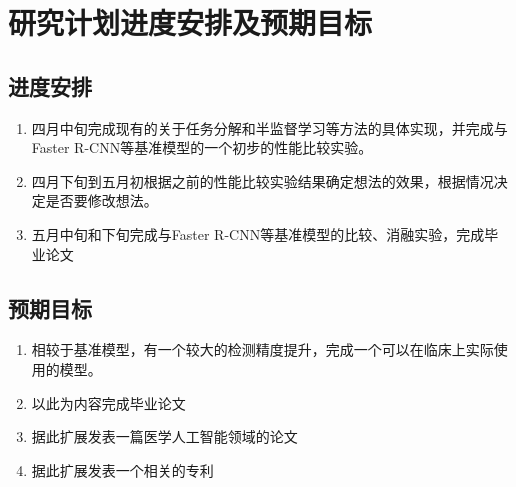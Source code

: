 \section{研究计划进度安排及预期目标}

\subsection{进度安排}
\begin{enumerate}
    \item 四月中旬完成现有的关于任务分解和半监督学习等方法的具体实现，并完成与Faster R-CNN等基准模型的一个初步的性能比较实验。
    \item 四月下旬到五月初根据之前的性能比较实验结果确定想法的效果，根据情况决定是否要修改想法。
    \item 五月中旬和下旬完成与Faster R-CNN等基准模型的比较、消融实验，完成毕业论文
\end{enumerate}

\subsection{预期目标}
\begin{enumerate}
    \item 相较于基准模型，有一个较大的检测精度提升，完成一个可以在临床上实际使用的模型。
    \item 以此为内容完成毕业论文
    \item 据此扩展发表一篇医学人工智能领域的论文
    \item 据此扩展发表一个相关的专利
\end{enumerate}
